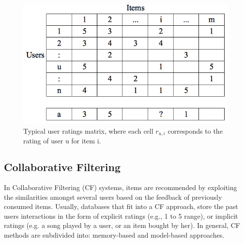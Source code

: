\begin{figure}[t]
\centering
\includegraphics[scale=0.9]{images/uimatrix}
\caption[Typical user rating matrix]{Typical user ratings matrix, where each cell $r_{u,i}$ corresponds to the rating of user u for item i.}
\label{fig:iomatrix}
\end{figure}

\subsection{Collaborative Filtering} 

In Collaborative Filtering (CF) systems, items are recommended by exploiting the similarities amongst several users based on the feedback of previously consumed items. Usually, databases that fit into a CF approach, store the past users interactions in the form of explicit ratings (e.g., 1 to 5 range), or implicit ratings (e.g. a song played by a user, or an item bought by her). In general, CF methods are subdivided into: memory-based and model-based approaches.

